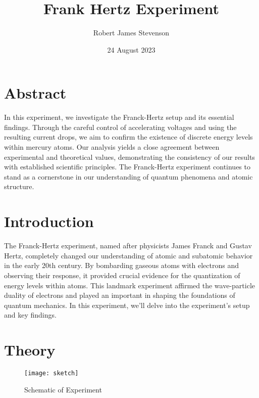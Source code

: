 \documentclass[12pt]{article}
\title{Frank Hertz Experiment}
\author{Robert James Stevenson}
\date{24 August 2023}
\newcommand{\mycomment}[1]{}
\begin{document}
\mycomment{
	label for EQS \label{}
	citing reference \cite{}
	equation

	\begin{equation}
		\label{eqn:somelabel}
		e=mc^2
	\end{equation}
}


\maketitle

\section{Abstract}
In this experiment, we investigate the Franck-Hertz setup and its essential findings.
Through the careful control of accelerating voltages and using the resulting current drops,
we aim to confirm the existence of discrete energy levels within mercury atoms. Our analysis yields a close agreement between experimental and theoretical values,
demonstrating the consistency of our results with established scientific principles.
The Franck-Hertz experiment continues to stand as a cornerstone in our understanding of quantum phenomena and atomic structure.

\section{Introduction}
The Franck-Hertz experiment, named after physicists James Franck and Gustav Hertz,
completely changed our understanding of atomic and subatomic behavior in the early 20th century.
By bombarding gaseous atoms with electrons and observing their response,
it provided crucial evidence for the quantization of energy levels within atoms.
This landmark experiment affirmed the wave-particle duality of electrons and played an important in shaping the foundations of quantum mechanics.
In this experiment, we'll delve into the experiment's setup and key findings. \cite{brief}

\section{Theory}

\begin{figure}[H]
	\texttt{[image: sketch]}
	\centering
	\caption{Schematic of Experiment}
	\label{fig:sketch}
\end{figure}
\end{document}
